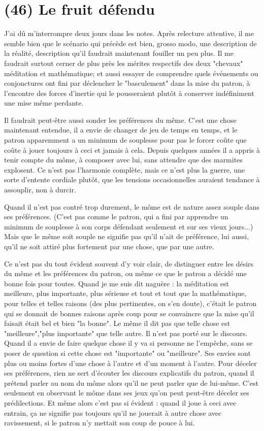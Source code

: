 \section{(46) Le fruit défendu}

J'ai dû m'interrompre deux jours dans les notes. Après relecture attentive, il me semble bien que le scénario qui précède est bien, grosso modo, une description de la réalité, description qu'il faudrait maintenant fouiller un peu plus. Il me faudrait surtout cerner de plus près les mérites respectifs des deux "chevaux" méditation et mathématique; et aussi essayer de comprendre quels événements ou conjonctures ont fini par déclencher le "basculement" dans la mise du patron, à l'encontre des forces d'inertie qui le pousseraient plutôt à conserver indéfiniment une mise même perdante.

Il faudrait peut-être aussi sonder les préférences du même. C'est une chose maintenant entendue, il a envie de changer de jeu de temps en temps, et le patron apparemment a un minimum de souplesse pour pas le forcer coûte que coûte à jouer toujours à ceci et jamais à cela. Depuis quelques années il a appris à tenir compte du môme, à composer avec lui, sans attendre que des marmites explosent. Ce n'est pas l'harmonie complète, mais ce n'est plus la guerre, une sorte d'entente cordiale plutôt, que les tensions occasionnelles auraient tendance à assouplir, non à durcir.

Quand il n'est pas contré trop durement, le môme est de nature assez souple dans ses préférences. (C'est pas comme le patron, qui a fini par apprendre un minimum de souplesse à son corps défendant seulement et sur ses vieux jours...) Mais que le même soit souple ne signifie pas qu’il n’ait de préférence, lui aussi, qu’il ne soit attiré plus fortement par une chose, que par une autre.

Ce n'est pas du tout évident souvent d'y voir clair, de distinguer entre les désirs du même et les préférences du patron, ou même ce que le patron a décidé une bonne fois pour toutes. Quand je me suis dit naguère : la méditation est meilleure, plus importante, plus sérieuse et tout et tout que la mathématique, pour telles et telles raisons (des plus pertinentes, on s'en doute), c'était le patron qui se donnait de bonnes raisons après coup pour se convaincre que la mise qu'il faisait était bel et bien "la bonne". Le même il dit pas que telle chose est "meilleure","plus importante" que telle autre. Il n'est pas porté sur le discours. Quand il a envie de faire quelque chose il y va si personne ne l'empêche, sans se poser de question si cette chose est "importante" ou "meilleure". Ses envies sont plus ou moins fortes d'une chose à l'autre et d'un moment à l'autre. Pour déceler ses préférences, rien ne sert d'écouter les discours explicatifs du patron, quand il prétend parler au nom du môme alors qu'il ne peut parler que de lui-même. C'est seulement en observant le môme dans ses jeux qu'on peut peut-être déceler ses prédilections. Et même alors c'est pas si évident : quand il joue à ceci avec entrain, ça ne signifie pas toujours qu’il ne jouerait à autre chose avec ravissement, si le patron n’y mettait son coup de pouce à lui.

